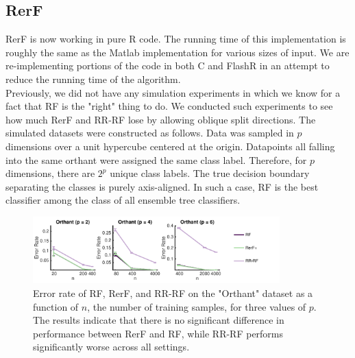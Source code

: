 \documentclass[simplex.tex]{subfiles}
\begin{document}
\subsection{RerF}

RerF is now working in pure R code.  The running time of this
implementation is roughly the same as the Matlab implementation for
various sizes of input.  We are re-implementing portions of the code in
both C and FlashR in an attempt to reduce the running time of the
algorithm. \\


Previously, we did not have any simulation experiments in which we know
for a fact that RF is the "right" thing to do. We conducted such
experiments to see how much RerF and RR-RF lose by allowing oblique
split directions. The simulated datasets were constructed as follows.
Data was sampled in $p$ dimensions over a unit hypercube centered at the
origin. Datapoints all falling into the same orthant were assigned the
same class label. Therefore, for $p$ dimensions, there are $2^p$ unique
class labels. The true decision boundary separating the classes is
purely axis-aligned. In such a case, RF is the best classifier among the
class of all ensemble tree classifiers.

\begin{figure}[!h]
\begin{cframed}
\centering
\includegraphics[width=0.85\textwidth]{../../figs/RerF.pdf}
\caption{Error rate of RF, RerF, and RR-RF on the "Orthant" dataset as a
  function of $n$, the number of training samples, for three values of
  $p$. The results indicate that there is no significant difference in
  performance between RerF and RF, while RR-RF performs significantly
  worse across all settings.}
\label{fig:name}
\end{cframed}
\end{figure}


\clearpage
\end{document}
